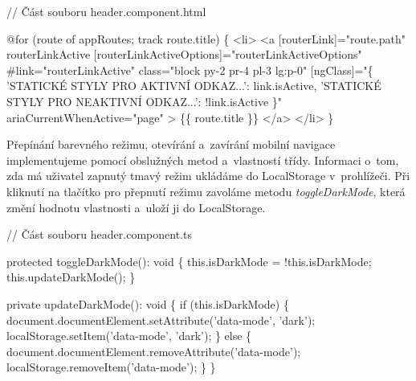 \begin{prog}
// Část souboru header.component.html

@for (route of appRoutes; track route.title) \{
  <li>
    <a
      [routerLink]="route.path"
      routerLinkActive
      [routerLinkActiveOptions]="routerLinkActiveOptions"
      #link="routerLinkActive"
      class="block py-2 pr-4 pl-3 lg:p-0"
      [ngClass]="\{
        'STATICKÉ STYLY PRO AKTIVNÍ ODKAZ...': link.isActive,
        'STATICKÉ STYLY PRO NEAKTIVNÍ ODKAZ...': !link.isActive
      \}"
      ariaCurrentWhenActive="page"
    >
      \{\{ route.title \}\}
    </a>
  </li>
\}
\end{prog}

Přepínání barevného režimu, otevírání a~zavírání mobilní navigace implementujeme pomocí obslužných metod a~vlastností třídy. 
Informaci o~tom, zda má uživatel zapnutý tmavý režim ukládáme do LocalStorage v~prohlížeči. 
Při kliknutí na tlačítko pro přepnutí režimu zavoláme metodu \emph{toggleDarkMode}, která změní hodnotu vlastnosti a~uloží ji do LocalStorage.

\begin{prog}
// Část souboru header.component.ts

protected toggleDarkMode(): void \{
  this.isDarkMode = !this.isDarkMode;
  this.updateDarkMode();
\}

private updateDarkMode(): void \{
  if (this.isDarkMode) \{
    document.documentElement.setAttribute('data-mode', 'dark');
    localStorage.setItem('data-mode', 'dark');
  \} else \{
    document.documentElement.removeAttribute('data-mode');
    localStorage.removeItem('data-mode');
  \}
\}
\end{prog}